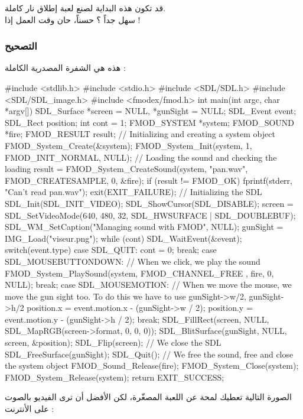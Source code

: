 قد تكون هذه البداية لصنع لعبة إطلاق نار كاملة.\\
سهل جداً ؟ حسناً، حان وقت العمل إذا !

\subsubsection{التصحيح}

هذه هي الشفرة المصدرية الكاملة :

\begin{Csource}
#include <stdlib.h>
#include <stdio.h>
#include <SDL/SDL.h>
#include <SDL/SDL_image.h>
#include <fmodex/fmod.h>
int main(int argc, char *argv[])
{
	SDL_Surface *screen = NULL, *gunSight = NULL;
	SDL_Event event;
	SDL_Rect position;
	int cont = 1;
	FMOD_SYSTEM *system;
	FMOD_SOUND *fire;
	FMOD_RESULT result;
	// Initializing and creating a system object
	FMOD_System_Create(&system);
	FMOD_System_Init(system, 1, FMOD_INIT_NORMAL, NULL);
	// Loading the sound and checking the loading
	result = FMOD_System_CreateSound(system, "pan.wav", FMOD_CREATESAMPLE, 0, &fire);
	if (result != FMOD_OK)
	{
		fprintf(stderr, "Can't read pan.wav\n");
		exit(EXIT_FAILURE);
	}
	// Initializing the SDL
	SDL_Init(SDL_INIT_VIDEO);
	SDL_ShowCursor(SDL_DISABLE);
	screen = SDL_SetVideoMode(640, 480, 32, SDL_HWSURFACE | SDL_DOUBLEBUF);
	SDL_WM_SetCaption("Managing sound with FMOD", NULL);
	gunSight = IMG_Load("viseur.png");
	while (cont)
	{
		SDL_WaitEvent(&event);
		switch(event.type)
		{
			case SDL_QUIT:
			cont = 0;
			break;
			case SDL_MOUSEBUTTONDOWN:
			// When we click, we play the sound
			FMOD_System_PlaySound(system, FMOD_CHANNEL_FREE , fire, 0, NULL);
			break;
			case SDL_MOUSEMOTION:
			// When we move the mouse, we move the gun sight too. To do this we have to use gunSight->w/2, gunSight->h/2
			position.x = event.motion.x - (gunSight->w / 2);
			position.y = event.motion.y - (gunSight->h / 2);
			break;
		}
		SDL_FillRect(screen, NULL, SDL_MapRGB(screen->format, 0, 0, 0));
		SDL_BlitSurface(gunSight, NULL, screen, &position);
		SDL_Flip(screen);
	}	
	// We close the SDL
	SDL_FreeSurface(gunSight);
	SDL_Quit();
	// We free the sound, free and close the system object
	FMOD_Sound_Release(fire);
	FMOD_System_Close(system);
	FMOD_System_Release(system);
	return EXIT_SUCCESS;
}
\end{Csource}

الصورة التالية تعطيك لمحة عن اللعبة المصغّرة، لكن الأفضل أن ترى الفيديو بالصوت على الأنترنت :



